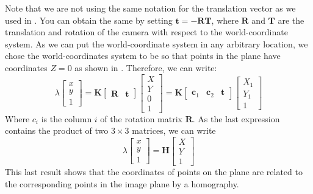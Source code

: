 Note that we are not using the same notation for the translation vector as we used in \eqn{\ref{eq:extrinsic}}. You can obtain the same by setting $\mathbf{t}= -\mathbf{R} \mathbf{T}$, where $ \mathbf{R}$ and $\mathbf{T}$ are the translation and rotation of the camera with respect to the world-coordinate system. As we can put the world-coordinate system in any arbitrary location, we chose the world-coordinates system to be so that points in the plane have coordinates $Z=0$ as shown in \fig{\ref{fig:homography_plane_geometry}}. Therefore, we can write:
\begin{equation}
    \lambda 
    \begin{bmatrix}
    x \\
    y \\
    1
    \end{bmatrix}
    =
    \mathbf{K}  
    \begin{bmatrix}
    \mathbf{R} & \mathbf{t} 
    \end{bmatrix}
    \begin{bmatrix}
    X \\
    Y \\
    0 \\
    1
    \end{bmatrix} 
    =
    \mathbf{K}  
    \begin{bmatrix}
    \mathbf{c}_1 & \mathbf{c}_2 &\mathbf{t} 
    \end{bmatrix}
    \begin{bmatrix}
    X_1 \\
    Y_1 \\
    1
    \end{bmatrix} 
\end{equation}
Where $c_i$ is the column $i$ of the rotation matrix $\mathbf{R}$. As the last expression contains the product of two $3 \times 3$ matrices, we can write 
\begin{equation}
    \lambda 
    \begin{bmatrix}
    x \\
    y \\
    1
    \end{bmatrix}
    =
    \mathbf{H}  
    \begin{bmatrix}
    X \\
    Y \\
    1
    \end{bmatrix} 
    \label{eq:projectionintofirstcamera}
\end{equation}
This last result shows that the coordinates of points on the plane are related to the corresponding points in the image plane by a homography.

